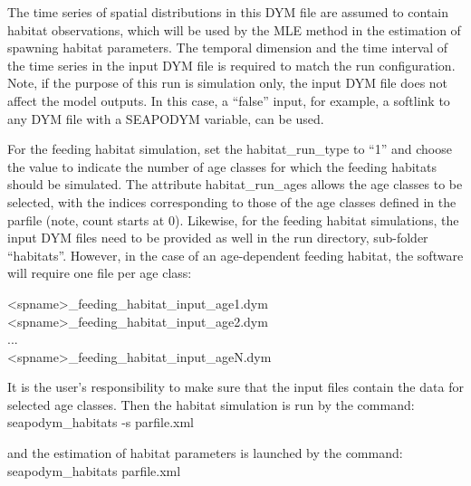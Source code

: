 \noindent The time series of spatial distributions in this DYM file are assumed to contain habitat observations, which will be used by the MLE method in the estimation of spawning habitat parameters. The temporal dimension and the time interval of the time series in the input DYM file is required to match the run configuration. Note, if the purpose of this run is simulation only, the input DYM file does not affect the model outputs. In this case, a ``false'' input, for example, a softlink to any DYM file with a SEAPODYM variable, can be used.  

For the feeding habitat simulation, set the {\ttfamily habitat\_run\_type} to ``1'' and choose the {\ttfamily value} to indicate the number of age classes for which the feeding habitats should be  simulated. The attribute {\ttfamily habitat\_run\_ages} allows the age classes to be selected, with the indices corresponding to those of the age classes defined in the parfile (note, count starts at 0). Likewise, for the feeding habitat simulations, the input DYM files need to be provided as well in the run directory, sub-folder ``habitats''. However, in the case of an age-dependent feeding habitat, the software will require one file per age class:

\vspace{0.2cm}
{\ttfamily 
\indent <spname>\_feeding\_habitat\_input\_age1.dym\\
\indent <spname>\_feeding\_habitat\_input\_age2.dym\\
\indent ...\\
\indent <spname>\_feeding\_habitat\_input\_ageN.dym\\
} 

\noindent It is the user's responsibility to make sure that the input files contain the data for selected age classes. Then the habitat simulation is run by the command:\\

\vspace{0.35cm}
{\ttfamily
  seapodym\_habitats -s parfile.xml\\
}
\vspace{0.2cm}


\noindent and the estimation of habitat parameters is launched by the command:\\

\vspace{0.35cm}
{\ttfamily
  seapodym\_habitats parfile.xml\\
}
\vspace{0.2cm}

